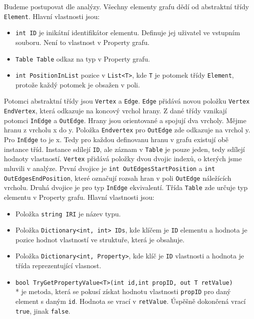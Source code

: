 Budeme postupovat dle analýzy.
Všechny elementy grafu dědí od abstraktní třídy \texttt{Element}.
Hlavní vlastnosti jsou:
\begin{itemize}
\item \texttt{int ID} je inikátní identifikátor elementu. Definuje jej uživatel ve vstupním souboru. Není to vlastnost v Property grafu.
\item \texttt{Table Table} odkaz na typ v Property grafu.
\item \texttt{int PositionInList} pozice v \texttt{List<T>}, kde \texttt{T} je potomek třídy \texttt{Element}, protože každý potomek je obsažen v poli.
\end{itemize}

Potomci abstraktní třídy jsou \texttt{Vertex} a \texttt{Edge}.
\texttt{Edge} přidává novou položku \texttt{Vertex EndVertex}, která odkazuje na koncový vrchol hrany.
Z dané třídy vznikají potomci \texttt{InEdge} a \texttt{OutEdge}.
Hrany jsou orientované a spojují dva vrcholy.
Mějme hranu z vrcholu x do y.
Položka \texttt{Endvertex} pro \texttt{OutEdge} zde odkazuje na vrchol y.
Pro \texttt{InEdge} to je x.
Tedy pro každou definovanu hranu v grafu existují obě instance tříd. 
Instance sdílejí \texttt{ID}, ale záznam v \texttt{Table} je pouze jeden, tedy sdílejí hodnoty vlastností. 
\texttt{Vertex} přidává položky dvou dvojic indexů, o kterých jsme mluvili v analýze.
První dvojice je \texttt{int OutEdgesStartPosition} a \texttt{int OutEdgesEndPosition}, které označují rozsah hran v poli \texttt{OutEdge} náležících vrcholu.
Druhá dvojice je pro typ \texttt{InEdge} ekvivalentí.
Třída \texttt{Table} zde určuje typ elementu v Property grafu.
Hlavní vlastnosti jsou:
\begin{itemize}
\item Položka \texttt{string IRI} je název typu.
\item Položka \texttt{Dictionary<int, int> IDs}, kde klíčem je \texttt{ID} elementu a hodnota je pozice hodnot vlastností ve struktuře, která je obsahuje.
\item Položka \texttt{Dictionary<int, Property>}, kde klíč je \texttt{ID} vlastnosti a hodnota je třída reprezentující vlasnost.
\item \texttt{bool TryGetPropertyValue<T>(int id,int propID, out T retValue)}\\* 
je metoda, která se pokusí získat hodnotu vlastnosti \texttt{propID} pro daný element s daným \texttt{id}.
Hodnota se vrací v \texttt{retValue}. Úspěšně dokončená vrací \texttt{true}, jinak \texttt{false}.
\end{itemize}

